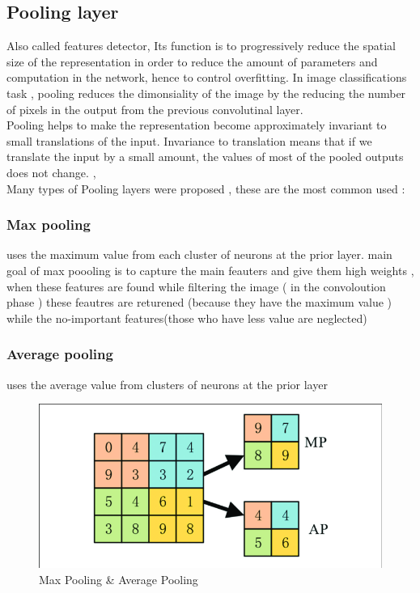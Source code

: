 \subsection{Pooling layer}
Also called features detector, Its function is to progressively reduce the spatial size of
the representation in order to reduce the amount of parameters and computation in the
network, hence to control overfitting. In image classifications task \cite{art20} , pooling reduces
the dimonsiality of the image by the reducing the number of pixels in the output from
the previous convolutinal layer. \vspace{4mm}\\
Pooling helps to make the representation become approximately invariant to small
translations of the input. Invariance to translation means that if we translate the input
by a small amount, the values of most of the pooled outputs does not change. \cite{art20}, \vspace{4mm} \\
Many types of Pooling layers were proposed \cite{art27}, these are the most common used :
\subsubsection{Max pooling}
uses the maximum value from each cluster of neurons at the prior
layer. main goal of max poooling is to capture the main feauters and give them high
weights , when these features are found while filtering the image ( in the convoloution
phase ) these feautres are returened (because they have the maximum value ) while the
no-important features(those who have less value are neglected)  \cite{c2}

\subsubsection{Average pooling}
uses the average value from clusters of neurons at the prior layer
\begin{figure}[!h]
    \centering
    \includegraphics[width=1\textwidth]{chapters/chapter02/fig02/pol.png}
    \caption{ Max Pooling & Average Pooling}
    \label{fig:my_label}
\end{figure}


